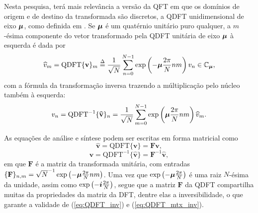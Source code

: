 Nesta pesquisa, ter\'a mais relev\^ancia a vers\~ao da QFT em que os dom\'inios de origem e de destino da transformada s\~ao discretos, a QDFT unidimensional de eixo $ \boldsymbol{\mu} $, como definida em \cite[sec. 3.3.1]{ell2014quaternion}. Se $ \boldsymbol{\mu} $ \'e um quat\'ernio unit\'ario puro qualquer, a $ m $-\'esima componente do vetor transformado pela QDFT unit\'aria de eixo $ \boldsymbol{\mu} $ \`a esquerda \'e dada por
\begin{equation}
\label{eq:QDFT_fwd}
\widehat{v}_m = \text{QDFT}\{ \mathbf{v} \}_m \overset{\Delta}{=} \frac{1}{\sqrt{N}} \sum_{n=0}^{N-1}  \exp \left( -\boldsymbol{\mu} \frac{2\pi}{N} nm \right) v_n \in \mathbb{C}_{\boldsymbol{\mu}},
\end{equation}
com a f\'ormula da transforma\c c\~ao inversa trazendo a m\'ultiplica\c c\~ao pelo n\'ucleo tamb\'em \`a esquerda:
\begin{equation}
\label{eq:QDFT_inv}
v_n = \text{QDFT}^{-1}\{ \widehat{\mathbf{v}} \}_n = \frac{1}{\sqrt{N}}\sum_{m=0}^{N-1}  \exp \left( \boldsymbol{\mu} \frac{2\pi}{N} nm \right) \widehat{v}_m.
\end{equation}

As equa\c c\~oes de an\'alise e s\'intese podem ser escritas em forma matricial como
\begin{equation}
\label{eq:QDFT}
\widehat{\mathbf{v}} = \text{QDFT}\{ \mathbf{v} \} = \mathbf{F} \mathbf{v},
\end{equation}
\begin{equation}
\label{eq:QDFT_mtx_inv}
\mathbf{v} = \text{QDFT}^{-1}\{ \widehat{\mathbf{v}} \} = \mathbf{F}^{-1} \widehat{\mathbf{v}},
\end{equation}
em que $ \mathbf{F} $ \'e a matriz da transformada unit\'aria,
com entradas $ \{\mathbf{F}\}_{n,m} = \sqrt{N}^{-1} \exp \left( -\boldsymbol{\mu} \frac{2\pi}{N} nm \right)$. Uma vez que  $ \exp \left( -\boldsymbol{\mu} \frac{2\pi}{N} \right) $ \'e uma raiz $ N $-\'esima da unidade, assim como $ \exp \left( -\boldsymbol{i} \frac{2\pi}{N} \right) $, segue que a matriz $ \mathbf{F} $ da QDFT compartilha muitas da propriedades da matriz da DFT, dentre elas a inversibilidade, o que garante a validade de (\ref{eq:QDFT_inv}) e  (\ref{eq:QDFT_mtx_inv}).

